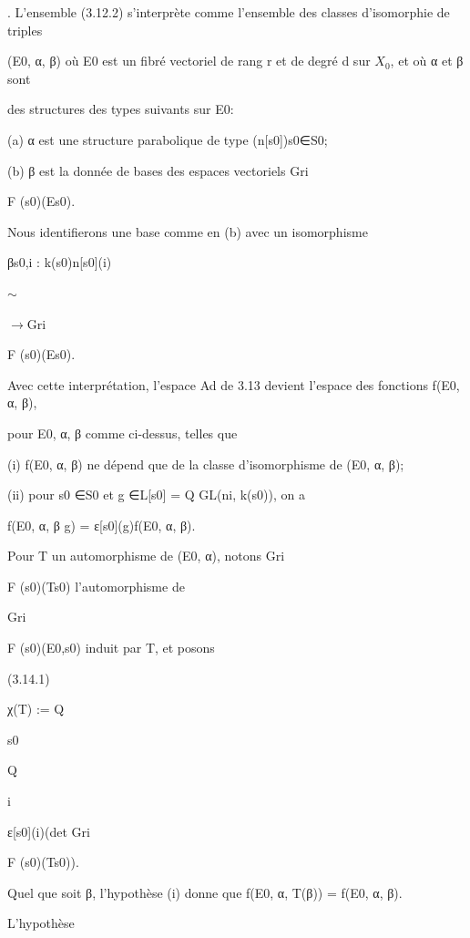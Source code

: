\documentclass[11pt]{article}
\begin{document}
. L’ensemble (3.12.2) s’interprète comme l’ensemble des classes d’isomorphie de triples\par
\noindent (E0, α, β) où E0 est un fibré vectoriel de rang r et de degré d sur \(X_0\), et où α et β sont\par
\noindent des structures des types suivants sur E0:\par
\noindent (a) α est une structure parabolique de type (n[s0])s0∈S0;\par
\noindent (b) β est la donnée de bases des espaces vectoriels Gri\par
\noindent F (s0)(Es0).\par
\noindent Nous identifierons une base comme en (b) avec un isomorphisme\par
\noindent βs0,i : k(s0)n[s0](i)\par
\noindent \(\sim\)\par
\noindent \(\to\)Gri\par
\noindent F (s0)(Es0).\par
\noindent Avec cette interprétation, l’espace Ad de 3.13 devient l’espace des fonctions f(E0, α, β),\par
\noindent pour E0, α, β comme ci-dessus, telles que\par
\noindent (i) f(E0, α, β) ne dépend que de la classe d’isomorphisme de (E0, α, β);\par
\noindent (ii) pour s0 ∈S0 et g ∈L[s0] = Q GL(ni, k(s0)), on a\par
\noindent f(E0, α, β g) = ε[s0](g)f(E0, α, β).\par
\noindent Pour T un automorphisme de (E0, α), notons Gri\par
\noindent F (s0)(Ts0) l’automorphisme de\par
\noindent Gri\par
\noindent F (s0)(E0,s0) induit par T, et posons\par
\noindent (3.14.1)\par
\noindent χ(T) := Q\par
\noindent s0\par
\noindent Q\par
\noindent i\par
\noindent ε[s0](i)(det Gri\par
\noindent F (s0)(Ts0)).\par
\medskip
\noindent Quel que soit β, l’hypothèse (i) donne que f(E0, α, T(β)) = f(E0, α, β).\par
\noindent L’hypothèse\par
\end{document}
